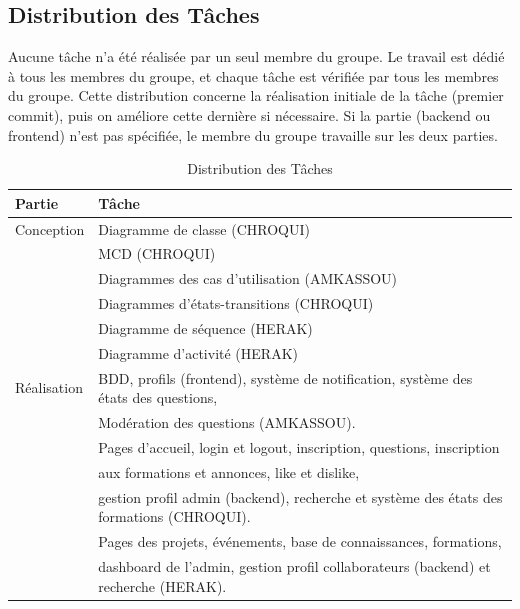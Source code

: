\documentclass{article}
\begin{document}
        \subsection{Distribution des Tâches}
            Aucune tâche n'a été réalisée par un seul membre du groupe. Le travail est dédié à tous les membres du groupe, et chaque tâche est vérifiée par tous les membres du groupe. Cette distribution concerne la réalisation initiale de la tâche (premier commit), puis on améliore cette dernière si nécessaire. \newline
            Si la partie (backend ou frontend) n'est pas spécifiée, le membre du groupe travaille sur les deux parties. \newline
            \begin{table}[h!]
                \centering
                \begin{tabular}{|l|l|}
                    \hline
                    Partie &
                    Tâche \\
                    \hline
                    Conception  &
                    Diagramme de classe (CHROQUI) \\
                                &
                    MCD (CHROQUI) \\
                                &
                    Diagrammes des cas d'utilisation (AMKASSOU) \\
                                &
                    Diagrammes d'états-transitions (CHROQUI) \\
                                &
                    Diagramme de séquence (HERAK) \\
                                &
                    Diagramme d'activité (HERAK) \\
                    \hline
                    Réalisation &
                    BDD, profils (frontend), système de notification, système des états des questions, \\
                                &
                    Modération des questions (AMKASSOU). \\
                                &
                    Pages d'accueil, login et logout, inscription, questions, inscription \\
                                &
                    aux formations et annonces, like et dislike, \\
                                &
                    gestion profil admin (backend), recherche et système des états des formations (CHROQUI). \\
                                &
                    Pages des projets, événements, base de connaissances, formations, \\
                                &
                    dashboard de l'admin, gestion profil collaborateurs (backend) et recherche (HERAK). \\
                    \hline
                \end{tabular}
                \caption{Distribution des Tâches}
            \end{table}
            \FloatBarrier
\end{document}
